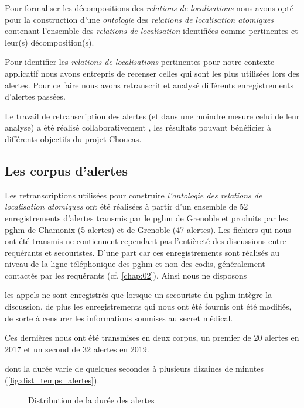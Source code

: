 Pour formaliser les décompositions des \emph{relations de
  localisations} nous avons opté pour la construction d'une
\emph{ontologie} des \emph{relations de localisation atomiques}
contenant l'ensemble des \emph{relations de localisation} identifiées
comme pertinentes et leur(s) décomposition(s).


Pour identifier les \emph{relations de localisations} pertinentes pour
notre contexte applicatif nous avons entrepris de recenser celles qui
sont les plus utilisées lors des alertes. Pour ce faire nous avons
retranscrit et analysé différents enregistrements d'alertes passées.

Le travail de retranscription des alertes (et dans une moindre mesure
celui de leur analyse) a été réalisé collaborativement
\autocite{Bunel2019}, les résultats pouvant bénéficier à différents
objectifs du projet Choucas.

\subsection{Les corpus d'alertes}

Les retranscriptions utilisées pour construire \emph{l'ontologie des
  relations de localisation atomiques} ont été réalisées à partir d'un
ensemble de 52 enregistrements d'alertes transmis par le \ac{pghm} de
Grenoble et produits par les \ac{pghm} de Chamonix (5 alertes) et de
Grenoble (47 alertes).
%
Les fichiers qui nous ont été transmis ne contiennent cependant pas
l'entièreté des discussions entre requérants et secouristes. D'une
part car ces enregistrements sont réalisés au niveau de la ligne
téléphonique des \ac{pghm} et non des \ac{codis}, généralement
contactés par les requérants (cf. \autoref{chap:02}). Ainsi nous ne
disposons 


les appels ne
sont enregistrés que lorsque un secouriste du \ac{pghm} intègre la
discussion, de plus les enregistrements qui nous ont été fournis ont
été modifiés, de sorte à censurer les informations soumises au secret
médical.

Ces dernières nous ont été transmises en deux corpus, un premier de 20
alertes en 2017 et un second de 32 alertes en 2019.

dont la durée varie de quelques secondes à plusieurs dizaines de
minutes (\autoref{fig:dist_temps_alertes}).

\begin{figure}
  \centering
  
  \caption{Distribution de la durée des alertes}
  \label{fig:dist_temps_alertes}
\end{figure}


